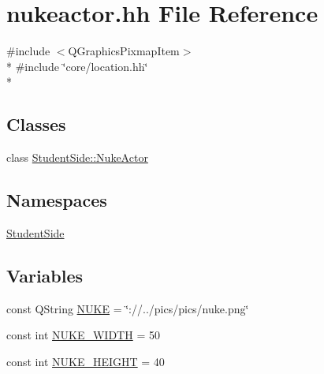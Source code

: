 \hypertarget{nukeactor_8hh}{\section{nukeactor.\-hh File Reference}
\label{nukeactor_8hh}
}
{\ttfamily \#include $<$Q\-Graphics\-Pixmap\-Item$>$}\\*
{\ttfamily \#include \char`\"{}core/location.\-hh\char`\"{}}\\*
\subsection*{Classes}
\begin{DoxyCompactItemize}
\item 
class \hyperlink{class_student_side_1_1_nuke_actor}{Student\-Side\-::\-Nuke\-Actor}
\end{DoxyCompactItemize}
\subsection*{Namespaces}
\begin{DoxyCompactItemize}
\item 
\hyperlink{namespace_student_side}{Student\-Side}
\end{DoxyCompactItemize}
\subsection*{Variables}
\begin{DoxyCompactItemize}
\item 
const Q\-String \hyperlink{nukeactor_8hh_a533b7f84d79dc6971f2d2b7db8c9206e}{N\-U\-K\-E} = \char`\"{}\-://../pics/pics/nuke.\-png\char`\"{}
\item 
const int \hyperlink{nukeactor_8hh_a86069c9a9259fea726afb281654acb9c}{N\-U\-K\-E\-\_\-\-W\-I\-D\-T\-H} = 50
\item 
const int \hyperlink{nukeactor_8hh_aa87a4f879db9b0096ae5c8b47973368c}{N\-U\-K\-E\-\_\-\-H\-E\-I\-G\-H\-T} = 40
\end{DoxyCompactItemize}


